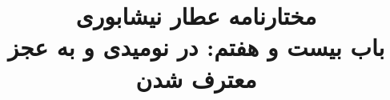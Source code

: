 \documentclass[14pt,b5paper]{article}
\begin{document}
\title{\Huge مختارنامه عطار نیشابوری \\
باب بیست و هفتم: در نومیدی و به عجز معترف شدن}
\author{ }
\date{ }
\maketitle
\newpage
\tableofcontents
\newpage

\newpage

\newpage

\newpage

\newpage

\newpage

\newpage

\newpage

\newpage

\newpage

\newpage

\newpage

\newpage

\newpage

\newpage

\newpage

\newpage

\newpage

\newpage

\newpage

\newpage

\newpage

\newpage

\newpage

\newpage

\newpage

\newpage

\newpage

\newpage

\newpage

\newpage

\newpage

\newpage

\newpage

\newpage

\newpage

\newpage

\newpage

\newpage

\newpage

\newpage

\newpage

\newpage

\newpage

\newpage

\newpage
\end{document}
